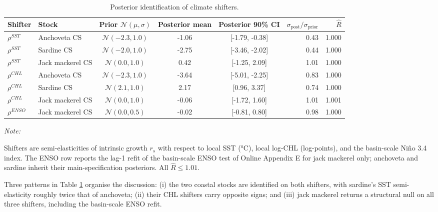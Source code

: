 \documentclass[
  11pt,
]{article}
\begin{document}
\begin{table}[!h]
\centering
\caption{\label{tab:rho-posterior-table}Posterior identification of climate shifters. \label{tab:rho-posteriors}}
\centering
\fontsize{10}{12}\selectfont
\begin{threeparttable}
\begin{tabular}[t]{llcccrr}
\toprule
Shifter & Stock & Prior $\mathcal{N}(\mu, \sigma)$ & Posterior mean & Posterior 90\% CI & $\sigma_{\text{post}}/\sigma_{\text{prior}}$ & $\hat{R}$\\
\midrule
$\rho^{SST}$ & Anchoveta CS & $\mathcal{N}(-2.3, 1.0)$ & -1.06 & {}[-1.79, -0.38] & 0.43 & 1.000\\
$\rho^{SST}$ & Sardine CS & $\mathcal{N}(-2.0, 1.0)$ & -2.75 & {}[-3.46, -2.02] & 0.44 & 1.000\\
$\rho^{SST}$ & Jack mackerel CS & $\mathcal{N}(0.0, 1.0)$ & 0.42 & {}[-1.25, 2.09] & 1.01 & 1.000\\
$\rho^{CHL}$ & Anchoveta CS & $\mathcal{N}(-2.3, 1.0)$ & -3.64 & {}[-5.01, -2.25] & 0.83 & 1.000\\
$\rho^{CHL}$ & Sardine CS & $\mathcal{N}(2.1, 1.0)$ & 2.17 & {}[0.96, 3.37] & 0.74 & 1.000\\
\addlinespace
$\rho^{CHL}$ & Jack mackerel CS & $\mathcal{N}(0.0, 1.0)$ & -0.06 & {}[-1.72, 1.60] & 1.01 & 1.001\\
$\rho^{ENSO}$ & Jack mackerel CS & $\mathcal{N}(0.0, 0.5)$ & -0.02 & {}[-0.81, 0.80] & 0.98 & 1.000\\
\bottomrule
\end{tabular}
\begin{tablenotes}
\item \textit{Note:} 
\item Shifters are semi-elasticities of intrinsic growth $r_s$ with respect to local SST (°C), local log-CHL (log-points), and the basin-scale Niño 3.4 index. The ENSO row reports the lag-1 refit of the basin-scale ENSO test of Online Appendix E for jack mackerel only; anchoveta and sardine inherit their main-specification posteriors. All $\hat{R} \leq 1.01$.
\end{tablenotes}
\end{threeparttable}
\end{table}

Three patterns in Table \ref{tab:rho-posteriors} organise the
discussion: (i) the two coastal stocks are identified on both shifters,
with sardine's SST semi-elasticity roughly twice that of anchoveta; (ii) their CHL
shifters carry opposite signs; and (iii)
jack mackerel returns a structural null on all three shifters, including the basin-scale ENSO refit.
\end{document}
